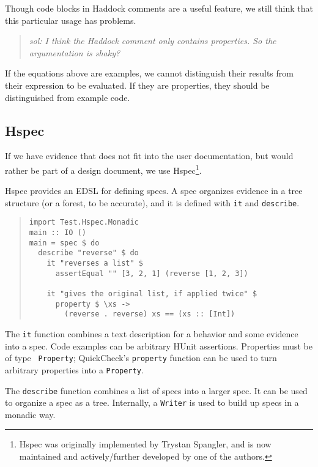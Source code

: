 \documentclass[preprint]{sigplanconf}
\begin{document}
\noindent Though code blocks in Haddock comments are a useful feature,
we still think that this particular usage has problems.


\begin{quote}
    \emph{sol: I think the Haddock comment only contains properties.
    So the argumentation is shaky?}
\end{quote}

If the equations above are examples, we cannot distinguish
their results from their expression to be evaluated.
If they are properties, they should be distinguished
from example code.

\subsection{Hspec}

If we have evidence that does not fit into the user documentation, but
would rather be part of a design document, we use Hspec\footnote{%
Hspec was originally implemented by Trystan Spangler, and is now
maintained and actively/further developed by one of the authors.}.

Hspec provides an EDSL for defining specs.  A spec organizes evidence
in a tree structure (or a forest, to be accurate), and it is defined
with \texttt{it} and \texttt{describe}.

\begin{quote}
\small
\begin{verbatim}
import Test.Hspec.Monadic
main :: IO ()
main = spec $ do
  describe "reverse" $ do
    it "reverses a list" $
      assertEqual "" [3, 2, 1] (reverse [1, 2, 3])

    it "gives the original list, if applied twice" $
      property $ \xs ->
        (reverse . reverse) xs == (xs :: [Int])
\end{verbatim}
\end{quote}

\noindent The {\tt it} function combines a text description for a
behavior and some evidence into a spec.
Code examples can be arbitrary HUnit assertions.  Properties must be of type {\tt
Property}; QuickCheck's \texttt{property} function can be used to turn
arbitrary properties into a \texttt{Property}.

The \texttt{describe} function combines a list of specs into a larger spec.
It can be used to organize a spec as a tree.
Internally, a \texttt{Writer} is used to build up specs in a monadic way.
\end{document}
